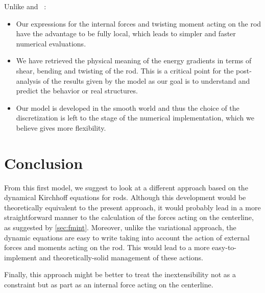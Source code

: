 Unlike  and ~:
\begin{itemize}
\item Our expressions for the internal forces and twisting moment acting on the rod have the advantage to be fully local, which leads to simpler and faster numerical evaluations.
\item We have retrieved the physical meaning of the energy gradients in terms of shear, bending and twisting of the rod. This is a critical point for the post-analysis of the results given by the model as our goal is to understand and predict the behavior or real structures.
\item Our model is developed in the smooth world and thus the choice of the discretization is left to the stage of the numerical implementation, which we believe gives more flexibility.
\end{itemize}

\section{Conclusion}
From this first model, we suggest to look at a different approach based on the dynamical Kirchhoff equations for rods. Although this development would be theoretically equivalent to the present approach, it would probably lead in a more straightforward manner to the calculation of the forces acting on the centerline, as suggested by \cref{sec:fmint}. Moreover, unlike the variational approach, the dynamic equations are easy to write taking into account the action of external forces and moments acting on the rod. This would lead to a more easy-to-implement and theoretically-solid management of these actions.

Finally, this approach might be better to treat the inextensibility not as a constraint but as part as an internal force acting on the centerline.



